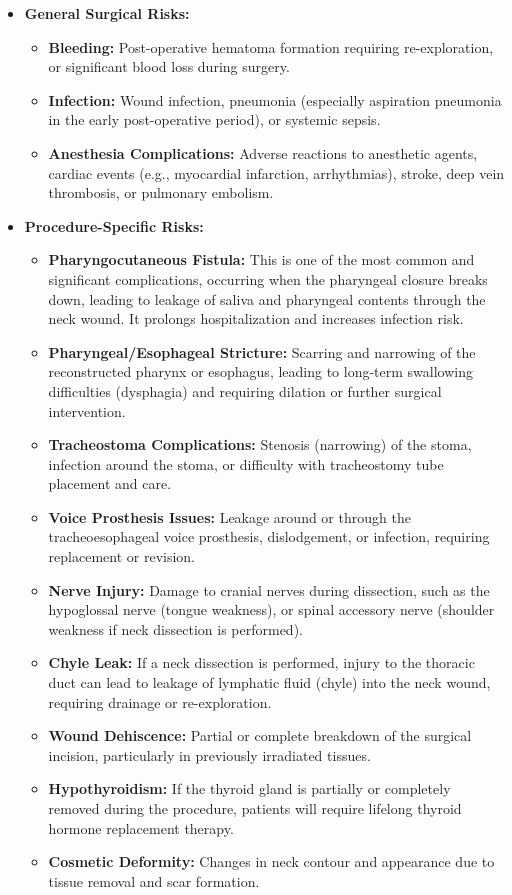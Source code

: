 \begin{itemize}
  \item \textbf{General Surgical Risks:}
    \begin{itemize}
      \item \textbf{Bleeding:} Post-operative hematoma formation requiring re-exploration, or significant blood loss during surgery.
      \item \textbf{Infection:} Wound infection, pneumonia (especially aspiration pneumonia in the early post-operative period), or systemic sepsis.
      \item \textbf{Anesthesia Complications:} Adverse reactions to anesthetic agents, cardiac events (e.g., myocardial infarction, arrhythmias), stroke, deep vein thrombosis, or pulmonary embolism.
    \end{itemize}

  \item \textbf{Procedure-Specific Risks:}
    \begin{itemize}
      \item \textbf{Pharyngocutaneous Fistula:} This is one of the most common and significant complications, occurring when the pharyngeal closure breaks down, leading to leakage of saliva and pharyngeal contents through the neck wound. It prolongs hospitalization and increases infection risk.
      \item \textbf{Pharyngeal/Esophageal Stricture:} Scarring and narrowing of the reconstructed pharynx or esophagus, leading to long-term swallowing difficulties (dysphagia) and requiring dilation or further surgical intervention.
      \item \textbf{Tracheostoma Complications:} Stenosis (narrowing) of the stoma, infection around the stoma, or difficulty with tracheostomy tube placement and care.
      \item \textbf{Voice Prosthesis Issues:} Leakage around or through the tracheoesophageal voice prosthesis, dislodgement, or infection, requiring replacement or revision.
      \item \textbf{Nerve Injury:} Damage to cranial nerves during dissection, such as the hypoglossal nerve (tongue weakness), or spinal accessory nerve (shoulder weakness if neck dissection is performed).
      \item \textbf{Chyle Leak:} If a neck dissection is performed, injury to the thoracic duct can lead to leakage of lymphatic fluid (chyle) into the neck wound, requiring drainage or re-exploration.
      \item \textbf{Wound Dehiscence:} Partial or complete breakdown of the surgical incision, particularly in previously irradiated tissues.
      \item \textbf{Hypothyroidism:} If the thyroid gland is partially or completely removed during the procedure, patients will require lifelong thyroid hormone replacement therapy.
      \item \textbf{Cosmetic Deformity:} Changes in neck contour and appearance due to tissue removal and scar formation.
    \end{itemize}
\end{itemize}

